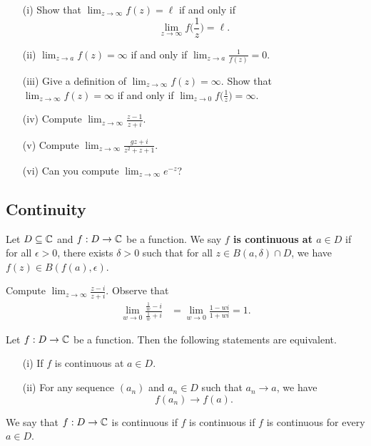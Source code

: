 \documentclass[a4paper]{report}
\begin{document}
\begin{problem}
    \begin{enumerate}
        \item[(i)] Show that \( \lim_{ z \to \infty  } f(z) = \ell  \) if and only if
            \[  \lim_{ z \to \infty  } f \Big(  \frac{ 1 }{ z }  \Big) = \ell.  \]
        \item[(ii)] \( \lim_{ z \to a } f(z) = \infty   \) if and only if \( \lim_{ z \to a }  \frac{ 1 }{ f(z) } = 0  \).
        \item[(iii)] Give a definition of \( \lim_{ z \to \infty  } f(z) = \infty   \). Show that \( \lim_{ z \to \infty  } f(z) = \infty  \) if and only if \( \lim_{ z \to 0 } f \Big(  \frac{ 1 }{ z }  \Big) = \infty  \).
        \item[(iv)] Compute \( \lim_{ z \to \infty  }  \frac{ z - 1  }{ z + i  }  \).
        \item[(v)] Compute \( \lim_{ z \to \infty    }  \frac{ gz + i  }{ z^{2} + z + 1  }  \). 
        \item[(vi)] Can you compute \( \lim_{ z \to \infty   }  e^{-z}  \)?
    \end{enumerate}
\end{problem}

\subsection{Continuity}\label{Continuity}

\begin{definition}[Continuity]
    Let \( D \subseteq \mathbb{C}   \) and \( f: D \to \mathbb{C}  \) be a function. We say \textbf{\( f  \) is continuous at \( a \in D  \)} if for all \( \epsilon > 0  \), there exists \( \delta > 0  \) such that for all \( z \in B(a,\delta) \cap D \), we have \( f(z) \in B(f(a), \epsilon) \).
\end{definition}

\begin{eg}
    Compute \( \lim_{ z \to \infty   }  \frac{ z - i  }{  z + i  }  \). Observe that 
    \begin{align*}
        \lim_{ w \to 0 } \frac{ \frac{ 1 }{ w }  - i  }{  \frac{ 1 }{ w }  + i  } &= \lim_{ w \to 0 }  \frac{ 1 - wi }{  1+ wi }  
                                                                                  = 1.
    \end{align*}
\end{eg}

\begin{lemma}
    Let \( f: D \to \mathbb{C}  \) be a function. Then the following statements are equivalent.
    \begin{enumerate}
        \item[(i)] If \( f  \) is continuous at \( a \in D  \).
        \item[(ii)] For any sequence \( ({a}_{n}) \) and \( {a}_{n} \in D  \) such that \( {a}_{n} \to a  \), we have
            \[  f({a}_{n})  \to f(a).\]
    \end{enumerate}
    We say that \( f: D \to \mathbb{C}  \) is continuous if \( f  \) is continuous if \( f  \) is continuous for every \( a \in D  \).
\end{lemma}
\end{document}
